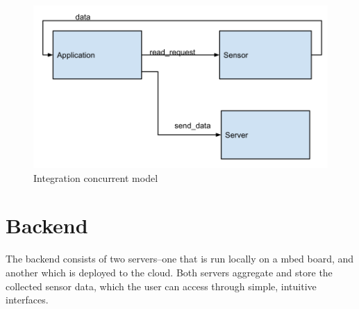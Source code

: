 \documentclass[10pt,twocolumn]{article}
\begin{document}
\begin{figure}[h]
  \centering
    \includegraphics[scale=0.35]{feedback.png}
  \caption{Integration concurrent model}
  \label{fig:integ}
\end{figure}
\section*{Backend}
The backend consists of two servers--one that is run locally on a mbed board, and another which is deployed to the cloud. Both servers aggregate and store the collected sensor data, which the user can access through simple, intuitive interfaces.  
\end{document}
